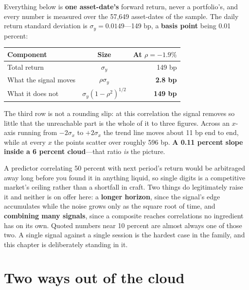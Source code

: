\begin{example}\label{ex:bp-split}
Everything below is \textbf{one asset-date's} forward return, never a portfolio's, and every number
is measured over the 57,649 asset-dates of the sample. The daily return standard deviation is
$\sigma_y = 0.0149$---149 bp, a \textbf{basis point} being 0.01 percent:

\begin{center}
\begin{tabular}{|l|c|r|}
\hline
\textbf{Component} & \textbf{Size} & \textbf{At $\rho = -1.9\%$} \\ \hline
Total return          & $\sigma_y$                     & 149 bp \\ \hline
What the signal moves & $\rho \sigma_y$                & \textbf{2.8 bp} \\ \hline
What it does not      & $\sigma_y (1 - \rho^2)^{1/2}$  & \textbf{149 bp} \\ \hline
\end{tabular}
\end{center}

The third row is not a rounding slip: at this correlation the signal removes so little that the
unreachable part is the whole of it to three figures. Across an $x$-axis running from $-2\sigma_x$
to $+2\sigma_x$ the trend line moves about 11 bp end to end, while at every $x$ the points scatter
over roughly 596 bp. \textbf{A 0.11 percent slope inside a 6 percent cloud}---that ratio \emph{is}
the picture.
\end{example}

\begin{note}
A predictor correlating 50 percent with next period's return would be arbitraged away long before
you found it in anything liquid, so single digits is a competitive market's ceiling rather than a
shortfall in craft. Two things do legitimately raise it and neither is on offer here: a
\textbf{longer horizon}, since the signal's edge accumulates while the noise grows only as the
square root of time, and \textbf{combining many signals}, since a composite reaches correlations no
ingredient has on its own. Quoted numbers near 10 percent are almost always one of those two. A
single signal against a single session is the hardest case in the family, and this chapter is
deliberately standing in it.
\end{note}


\section{Two ways out of the cloud}\label{sec:two-ways-out}

